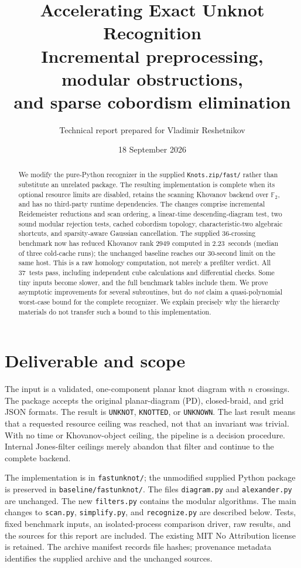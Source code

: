\documentclass[11pt]{article}
\title{Accelerating Exact Unknot Recognition\\[5pt]
\large Incremental preprocessing, modular obstructions,\\and sparse cobordism elimination}
\author{Technical report prepared for Vladimir Reshetnikov}
\date{18 September 2026}
\theoremstyle{remark}\newtheorem{remark}[theorem]{Remark}
\newcommand{\F}{\mathbb F}
\newcommand{\code}[1]{\texttt{\small #1}}
\newcommand{\HardTime}{2.23}
\newcommand{\TimeLimit}{30}
\newcommand{\TestCount}{37}
\begin{document}
\maketitle
\begin{abstract}
We modify the pure-Python recognizer in the supplied \code{Knots.zip/fast/}
rather than substitute an unrelated package. The resulting implementation is
complete when its optional resource limits are disabled, retains the scanning
Khovanov backend over $\F_2$, and has no third-party runtime dependencies.
The changes comprise incremental Reidemeister reductions and scan ordering,
a linear-time descending-diagram test, two sound modular rejection tests,
cached cobordism topology, characteristic-two algebraic shortcuts, and
sparsity-aware Gaussian cancellation. The supplied 36-crossing benchmark now
has reduced Khovanov rank $2949$ computed in \HardTime\ seconds (median of
three cold-cache runs); the unchanged baseline reaches our \TimeLimit-second
limit on the same host. This is a raw homology computation, not merely a
prefilter verdict. All \TestCount\ tests pass, including independent cube
calculations and differential checks. Some tiny inputs become slower, and the
full benchmark tables include them. We prove asymptotic improvements for
several subroutines, but do \emph{not} claim a quasi-polynomial worst-case
bound for the complete recognizer. We explain precisely why the hierarchy
materials do not transfer such a bound to this implementation.
\end{abstract}
\vspace{0.5em}

\section{Deliverable and scope}

The input is a validated, one-component planar knot diagram with $n$ crossings.
The package accepts the original planar-diagram (PD), closed-braid, and grid
JSON formats. The result is \code{UNKNOT}, \code{KNOTTED}, or \code{UNKNOWN}.
The last result means that a requested resource ceiling was reached, not that
an invariant was trivial. With no time or Khovanov-object ceiling, the pipeline
is a decision procedure. Internal Jones-filter ceilings merely abandon that
filter and continue to the complete backend.

The implementation is in \code{fastunknot/}; the unmodified supplied Python
package is preserved in \code{baseline/fastunknot/}. The files
\code{diagram.py} and \code{alexander.py} are unchanged. The new
\code{filters.py} contains the modular algorithms. The main changes to
\code{scan.py}, \code{simplify.py}, and \code{recognize.py} are described below.
Tests, fixed benchmark inputs, an isolated-process comparison driver, raw
results, and the sources for this report are included. The existing MIT
No Attribution license is retained. The archive manifest records file hashes;
provenance metadata identifies the supplied archive and the unchanged sources.
\end{document}
